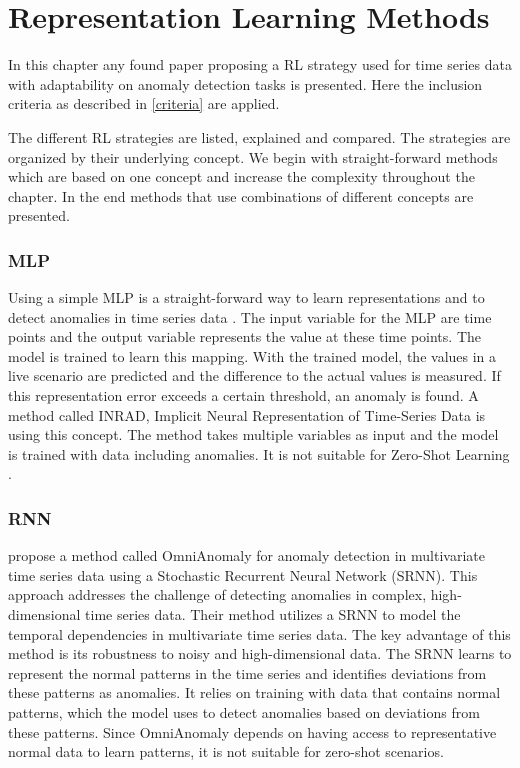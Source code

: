 \section{Representation Learning Methods}\label{review}
In this chapter any found paper proposing a RL strategy used for time series data with adaptability on anomaly detection tasks is presented. Here the inclusion criteria as described in \ref{criteria} are applied.

The different RL strategies are listed, explained and compared. The strategies are organized by their underlying concept. We begin with straight-forward methods which are based on one concept and increase the complexity throughout the chapter. In the end methods that use combinations of different concepts are presented.
\subsubsection{MLP}
Using a simple MLP is a straight-forward way to learn representations and to detect anomalies in time series data \cite{nielsen_neural_2015}. The input variable for the MLP are time points and the output variable represents the value at these time points. The model is trained to learn this mapping. With the trained model, the values in a live scenario are predicted and the difference to the actual values is measured. If this representation error exceeds a certain threshold, an anomaly is found. A method called INRAD, Implicit Neural Representation of Time-Series Data is using this concept. The method takes multiple variables as input and the model is trained with data including anomalies. It is not suitable for Zero-Shot Learning \cite{jeong_time-series_2022}.
\subsubsection{RNN}
\cite{su_robust_2019} propose a method called OmniAnomaly for anomaly detection in multivariate time series data using a Stochastic Recurrent Neural Network (SRNN). This approach addresses the challenge of detecting anomalies in complex, high-dimensional time series data.
Their method utilizes a SRNN to model the temporal dependencies in multivariate time series data.
The key advantage of this method is its robustness to noisy and high-dimensional data. The SRNN learns to represent the normal patterns in the time series and identifies deviations from these patterns as anomalies. It relies on training with data that contains normal patterns, which the model uses to detect anomalies based on deviations from these patterns. Since OmniAnomaly depends on having access to representative normal data to learn patterns, it is not suitable for zero-shot scenarios.
